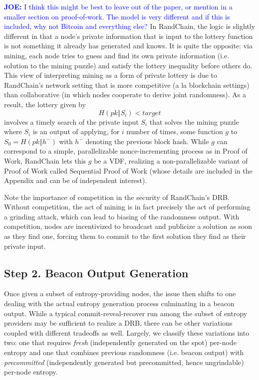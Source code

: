 \documentclass[letterpaper,twocolumn,10pt]{article}
\theoremstyle{definition}
\theoremstyle{remark}
\newcommand{\joenote}[1]{\textcolor{blue}{\textbf{JOE:} #1}}
\begin{document}
\joenote{I think this might be best to leave out of the paper, or mention in a smaller section on proof-of-work. The model is very different and if this is included, why not Bitcoin and everything else?}
In RandChain, the logic is slightly different in that a node's private information that is input to the lottery function is not something it already has generated and knows. It is quite the opposite: via mining, each node tries to guess and find its own private information (i.e. solution to the mining puzzle) and satisfy the lottery inequality before others do. This view of interpreting mining as a form of private lottery is due to RandChain's network setting that is more competitive (a la blockchain settings) than collaborative (in which nodes cooperate to derive joint randomness). As a result, the lottery given by
\[
H(pk \mathbin\Vert S_i) < target
\]
involves a timely search of the private input $S_i$ that solves the mining puzzle where $S_i$ is an output of applying, for $i$ number of times, some function $g$ to $S_0 = H(pk \mathbin\Vert h^-)$ with $h^-$ denoting the previous block hash. While $g$ can correspond to a simple, parallelizable nonce-incrementing process as in Proof of Work, RandChain lets this $g$ be a VDF, realizing a non-parallelizable variant of Proof of Work called Sequential Proof of Work (whose details are included in the Appendix and can be of independent interest).

Note the importance of competition in the security of RandChain's DRB. Without competition, the act of mining is in fact precisely the act of performing a grinding attack, which can lead to biasing of the randomness output. With competition, nodes are incentivized to broadcast and publicize a solution as soon as they find one, forcing them to commit to the first solution they find as their private input.

\subsection{Step 2. Beacon Output Generation}
Once given a subset of entropy-providing nodes, the issue then shifts to one dealing with the actual entropy generation process culminating in a beacon output. While a typical commit-reveal-recover run among the subset of entropy providers may be sufficient to realize a DRB, there can be other variations coupled with different tradeoffs as well. Largely, we classify these variations into two: one that requires \textit{fresh} (independently generated on the spot) per-node entropy and one that combines previous randomness (i.e. beacon output) with \textit{precommitted} (independently generated but precommitted, hence ungrindable) per-node entropy.
\end{document}
